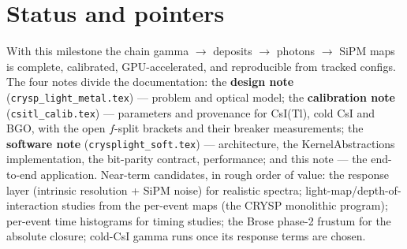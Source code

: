\documentclass[11pt,a4paper]{article}
\newcommand{\code}[1]{\texttt{#1}}
\newcommand{\csitl}{CsI(Tl)}
\begin{document}
\section{Status and pointers}

With this milestone the chain gamma $\to$ deposits $\to$ photons $\to$ SiPM maps is
complete, calibrated, GPU-accelerated, and reproducible from tracked configs. The
four notes divide the documentation: the \textbf{design note}
(\code{crysp\_light\_metal.tex}) --- problem and optical model; the
\textbf{calibration note} (\code{csitl\_calib.tex}) --- parameters and provenance for
\csitl{}, cold CsI and BGO, with the open $f$-split brackets and their breaker
measurements; the \textbf{software note} (\code{crysplight\_soft.tex}) ---
architecture, the KernelAbstractions implementation, the bit-parity contract,
performance; and this note --- the end-to-end application. Near-term candidates, in
rough order of value: the response layer (intrinsic resolution + SiPM noise) for
realistic spectra; light-map/depth-of-interaction studies from the per-event maps (the
CRYSP monolithic program); per-event time histograms for timing studies; the Brose
phase-2 frustum for the absolute closure; cold-CsI gamma runs once its response terms
are chosen.
\end{document}
